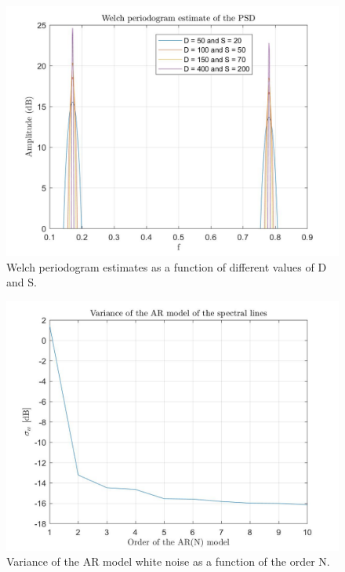 \documentclass[a4paper,11pt,openright,twoside]{report}
\begin{document}
\begin{figure}
	\centering
	\includegraphics[width=14cm]{images/Welch_vs_SD_2.jpg}
	\caption{Welch periodogram estimates as a function of different values of D and S.}\label{WelchSD_2}
\end{figure}	
\begin{figure}[h]
	\centering
	\includegraphics[width=14cm]{images/sigma_vs_N_2.jpg}
	\caption{Variance of the AR model white noise as a function of the order N.}\label{sigmavsN_2}
\end{figure}	


\clearpage
\end{document}

